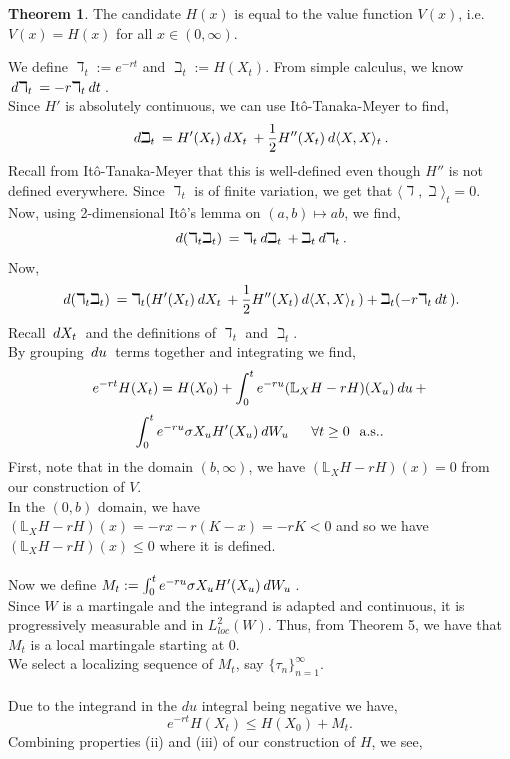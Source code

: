 \documentclass[12pt]{article}
\newcommand{\bL}{\mathbb{L}}
\newcommand{\df}[1]{\hspace{2 px} d #1 \hspace{2 px}}
\newcommand{\spc}{\hspace{7 px}}
\newcommand{\la}{\langle}
\newcommand{\ra}{\rangle}
\newcommand{\als}{\text{a.s.}}
\theoremstyle{definition}
\newtheorem{thm}{Theorem}
\begin{document}
\begin{thm}
    The candidate $H(x)$ is equal to the value function $V(x)$, i.e.
    $V(x) = H(x)$ for all $x \in (0,\infty)$.

    \proof
    We define $\daleth_t := e^{-rt}$ and $\beth_t := H(X_t)$.
    From simple calculus, we know $\df{\daleth_t} = -r \daleth_t \df{t}$. \\
    Since $H'$ is absolutely continuous, we can use Itô-Tanaka-Meyer to find,
    \[
        \df{\beth_t} = H'(X_t) \df{X_t} + \frac{1}{2} H''(X_t) \df{\la X, X \ra_t}.
    \]
    Recall from Itô-Tanaka-Meyer that this is well-defined even though $H''$ is not defined everywhere.
    Since $\daleth_t$ is of finite variation, we get that $\la \daleth, \beth \ra_t = 0$. \\
    Now, using 2-dimensional Itô's lemma on $(a,b) \mapsto ab$, we find,
    \[
        \df{(\daleth_t \beth_t)} = \daleth_t \df{\beth_t} + \beth_t \df{\daleth_t}.
    \]
    Now,
    \[
        \df{(\daleth_t \beth_t)} = \daleth_t (H'(X_t) \df{X_t} + \frac{1}{2} H''(X_t) \df{\la X, X \ra_t}) + \beth_t (-r \daleth_t \df{t}).
    \]
    Recall $\df{X_t}$ and the definitions of $\daleth_t$ and $\beth_t$. \\
    By grouping $\df{u}$ terms together and integrating we find,
    \[
        e^{-rt} H(X_t) = H(X_0) + \int_0^t e^{-ru } (\bL_X H - r H)(X_u) \df{u} +
    \]
    \[
        \int_0^t e^{-ru} \sigma X_u H'(X_u) \df{W_u} \spc \spc \forall t \geq 0 \spc \als.
    \]
    First, note that in the domain $(b, \infty)$, we have $(\bL_X H - r H)(x) = 0$ from our construction of $V$. \\
    In the $(0,b)$ domain, we have $(\bL_X H - rH)(x) = -rx - r(K - x) = -rK < 0$ and so we have $(\bL_X H - rH)(x) \leq 0$ where it is defined. \\
    \\
    Now we define $M_t := \int_0^t e^{-ru} \sigma X_u H'(X_u) \df{W_u}$. \\
    Since $W$ is a martingale and the integrand is adapted and continuous, it is progressively measurable and in $L^2_{loc}(W)$. Thus, from Theorem 5, we have that $M_t$ is a local martingale starting at 0. \\
    We select a localizing sequence of $M_t$, say $\{\tau_n\}_{n=1}^\infty$. \\
    \\
    Due to the integrand in the $du$ integral being negative we have,
    \[
        e^{-rt} H(X_t) \leq H(X_0) + M_t.
    \]
    Combining properties (ii) and (iii) of our construction of $H$, we see,

\end{thm}
\end{document}
